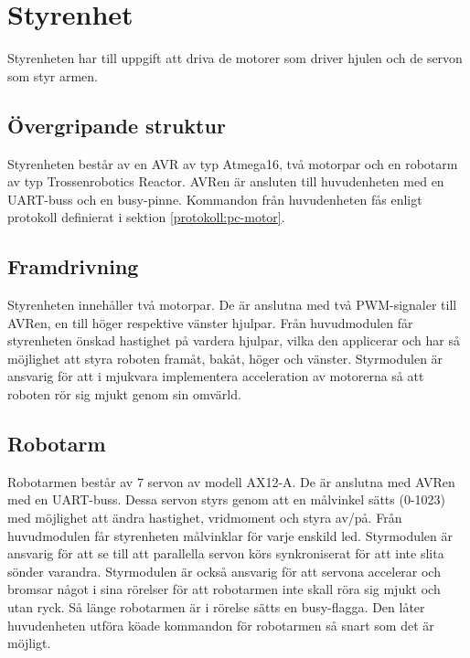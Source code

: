 
\section{Styrenhet}

Styrenheten har till uppgift att driva de motorer som driver hjulen och de servon som styr armen.

\subsection{Övergripande struktur}

Styrenheten består av en AVR av typ Atmega16, två motorpar och en robotarm av typ Trossenrobotics Reactor. AVRen är ansluten till huvudenheten med en UART-buss och en  busy-pinne. Kommandon från huvudenheten fås enligt protokoll definierat i sektion \ref{protokoll:pc-motor}.\\


\subsection{Framdrivning}

Styrenheten innehåller två motorpar. De är anslutna med två PWM-signaler till AVRen, en till höger respektive vänster hjulpar. Från huvudmodulen får styrenheten önskad hastighet på vardera hjulpar, vilka den applicerar och har så möjlighet att styra roboten framåt, bakåt, höger och vänster. Styrmodulen är ansvarig för att i mjukvara implementera acceleration av motorerna så att roboten rör sig mjukt genom sin omvärld.

\subsection{Robotarm}

Robotarmen består av 7 servon av modell AX12-A. De är anslutna med AVRen med en UART-buss. Dessa servon styrs genom att en målvinkel sätts (0-1023) med möjlighet att ändra hastighet, vridmoment och styra av/på. Från huvudmodulen får styrenheten målvinklar för varje enskild led. Styrmodulen är ansvarig för att se till att parallella servon körs synkroniserat för att inte slita sönder varandra. Styrmodulen är också ansvarig för att servona accelerar och bromsar något i sina rörelser för att robotarmen inte skall röra sig mjukt och utan ryck. Så länge robotarmen är i rörelse sätts en busy-flagga. Den låter huvudenheten utföra köade kommandon för robotarmen så snart som det är möjligt. 

